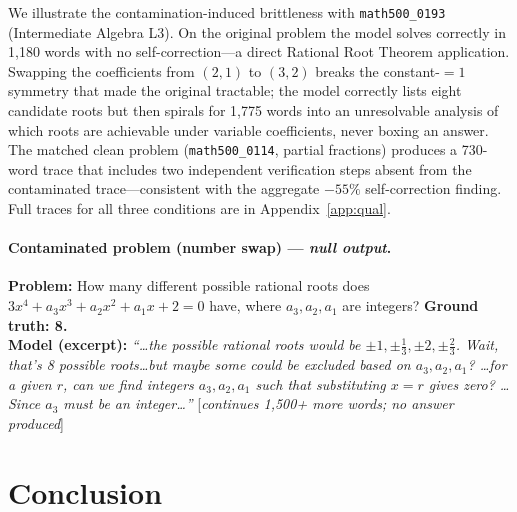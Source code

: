 \documentclass{article} %
\begin{document}
We illustrate the contamination-induced brittleness with \texttt{math500\_0193} (Intermediate Algebra L3). On the original problem the model solves correctly in 1,180 words with no self-correction---a direct Rational Root Theorem application. Swapping the coefficients from $(2,1)$ to $(3,2)$ breaks the constant-$= 1$ symmetry that made the original tractable; the model correctly lists eight candidate roots but then spirals for 1,775 words into an unresolvable analysis of which roots are achievable under variable coefficients, never boxing an answer. The matched clean problem (\texttt{math500\_0114}, partial fractions) produces a 730-word trace that includes two independent verification steps absent from the contaminated trace---consistent with the aggregate $-55\%$ self-correction finding. Full traces for all three conditions are in Appendix~\ref{app:qual}.

\paragraph{Contaminated problem (number swap) --- \textit{null output}.}
\begin{mdframed}
\textbf{Problem:} How many different possible rational roots does $3x^4 + a_3x^3 + a_2x^2 + a_1x + 2 = 0$ have, where $a_3, a_2, a_1$ are integers? \quad \textbf{Ground truth: 8.}\\[4pt]
\textbf{Model (excerpt):} \textit{``\ldots the possible rational roots would be $\pm1, \pm\frac{1}{3}, \pm2, \pm\frac{2}{3}$. Wait, that's 8 possible roots\ldots but maybe some could be excluded based on $a_3, a_2, a_1$? \ldots for a given $r$, can we find integers $a_3, a_2, a_1$ such that substituting $x{=}r$ gives zero? \ldots Since $a_3$ must be an integer\ldots''} [\textit{continues 1,500+ more words; no answer produced}]
\end{mdframed}

\section{Conclusion}
\end{document}
